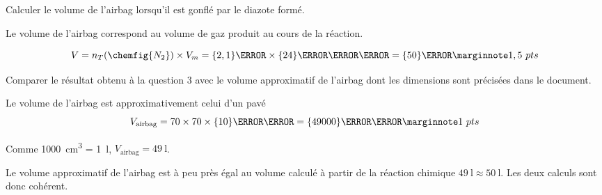 \numeroQuestion Calculer le volume de l’airbag lorsqu’il est gonflé par le diazote formé.

\begin{encart}
  Le volume de l'airbag correspond au volume de gaz produit au cours de la réaction.
  
  \begin{equation*}
    V = n_T(\chemfig{N_2}) \times V_m = \qty{2,1}{\mole} \times \qty{24}{\litre\per\mole} = \qty{50}{\litre}
    \points{1,5}
  \end{equation*}  
\end{encart}

\numeroQuestion Comparer le résultat obtenu à la question 3 avec le volume approximatif de l’airbag dont les dimensions sont précisées dans le document. 

\begin{encart}
  Le volume de l'airbag est approximativement celui d'un pavé
  \begin{equation*}  
    V_\text{airbag} = 70\times 70\times \qty{10}{\cm\cubed} = \qty{49000}{\cm\cubed}
    \points{1}
  \end{equation*}
  
  Comme \qty{1000}{\cm\cubed} = \qty{1}{\litre}, $V_\text{airbag} = \qty{49}{\litre}$.
  
  Le volume approximatif de l'airbag est à peu près égal au volume calculé à partir de la réaction chimique $\qty{49}{\litre} \approx \qty{50}{\litre}$.
  Les deux calculs sont donc cohérent.
\end{encart}
